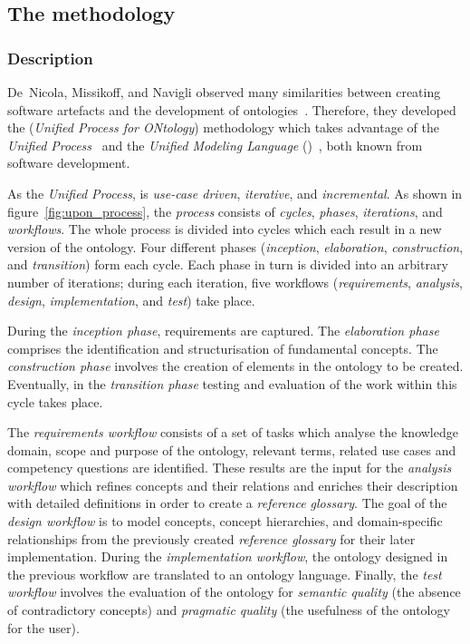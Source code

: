 \subsection{The  methodology}
\label{subsec:approach2}

\subsubsection{Description}

De~Nicola, Missikoff, and Navigli observed many similarities between creating software artefacts and the development of ontologies~\cite{SoftwareEngineeringOntology}. Therefore, they developed the  (\emph{Unified Process for ONtology}) methodology which takes advantage of the \emph{Unified Process}~\cite{UnifiedProcess} and the \emph{Unified Modeling Language} ()~\cite{UML}, both known from software development.

As the \emph{Unified Process},  is \emph{use-case driven}, \emph{iterative}, and \emph{incremental}. As shown in figure~\ref{fig:upon_process}, the  \emph{process} consists of \emph{cycles}, \emph{phases}, \emph{iterations}, and \emph{workflows}. The whole process is divided into cycles which each result in a new version of the ontology. Four different phases (\emph{inception}, \emph{elaboration}, \emph{construction}, and \emph{transition}) form each cycle. Each phase in turn is divided into an arbitrary number of iterations; during each iteration, five workflows (\emph{requirements}, \emph{analysis}, \emph{design}, \emph{implementation}, and \emph{test}) take place.

During the \emph{inception phase}, requirements are captured. The \emph{elaboration phase} comprises the identification and structurisation of fundamental concepts. The \emph{construction phase} involves the creation of elements in the ontology to be created. Eventually, in the \emph{transition phase} testing and evaluation of the work within this cycle takes place.

The \emph{requirements workflow} consists of a set of tasks which analyse the knowledge domain, scope and purpose of the ontology, relevant terms, related use cases and competency questions are identified. These results are the input for the \emph{analysis workflow} which refines concepts and their relations and enriches their description with detailed definitions in order to create a \emph{reference glossary}. The goal of the \emph{design workflow} is to model concepts, concept hierarchies, and domain-specific relationships from the previously created \emph{reference glossary} for their later implementation.
During the \emph{implementation workflow}, the ontology designed in the previous workflow are translated to an ontology language. Finally, the \emph{test workflow} involves the evaluation of the ontology for \emph{semantic quality} (the absence of contradictory concepts) and \emph{pragmatic quality} (the usefulness of the ontology for the user).

